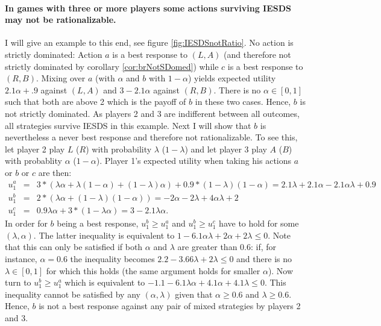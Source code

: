 \documentclass[a4paper,11pt]{article}
\begin{document}
\paragraph{In games with three or more players some actions surviving IESDS may not be rationalizable. }I will give an example to this end, see figure \ref{fig:IESDSnotRatio}. No action is strictly dominated: Action $a$ is a best response to $(L,A)$ (and therefore not strictly dominated by corollary \ref{cor:brNotSDomed}) while $c$ is a best response to $(R,B)$. Mixing over $a$ (with $\alpha$ and $b$ with $1-\alpha$) yields expected utility $2.1\alpha+.9$ against $(L,A)$ and $3-2.1\alpha$ against $(R,B)$. There is no $\alpha\in[0,1]$ such that both are above 2 which is the payoff of $b$ in these two cases. Hence, $b$ is not strictly dominated. As players 2 and 3 are indifferent between all outcomes, all strategies survive IESDS in this example. Next I will show that $b$ is nevertheless a never best response and therefore not rationalizable. To see this, let player 2 play $L$ ($R$) with probability $\lambda$ ($1-\lambda$) and let player 3 play $A$ ($B$) with probablity $\alpha$ ($1-\alpha$). Player 1's expected utility when taking his actions $a$ or $b$ or $c$ are then:
\begin{eqnarray*}
  u^a_1&=&3*(\lambda\alpha+\lambda(1-\alpha)+(1-\lambda)\alpha)+0.9*(1-\lambda)(1-\alpha)=2.1\lambda+2.1\alpha-2.1\alpha\lambda+0.9\\
  u_1^b&=&2*(\lambda\alpha+(1-\lambda)(1-\alpha))=-2\alpha-2\lambda+4\alpha\lambda+2\\
  u_1^c&=&0.9\lambda\alpha+3*(1-\lambda\alpha)=3-2.1\lambda\alpha.
\end{eqnarray*}
In order for $b$ being a best response, $u_1^b\geq u_1^a$ and $u_1^b\geq u_1^c$ have to hold for some $(\lambda,\alpha)$. The latter inequality is equivalent to $1-6.1\alpha\lambda+2\alpha+2\lambda\leq 0$. Note that this can only be satisfied if both $\alpha$ and $\lambda$ are greater than 0.6: if, for instance, $\alpha=0.6$ the inequality becomes $2.2-3.66\lambda+2\lambda\leq 0$ and there is no $\lambda\in[0,1]$ for which this holds (the same argument holds for smaller $\alpha$). Now turn to  $u_1^b\geq u_1^a$ which is equivalent to $-1.1-6.1\lambda\alpha+4.1\alpha+4.1\lambda\leq 0$. This inequality cannot be satisfied by any $(\alpha,\lambda)$ given that $\alpha\geq0.6$ and $\lambda\geq 0.6$. Hence, $b$ is not a best response against any pair of mixed strategies by players 2 and 3.
\end{document}
